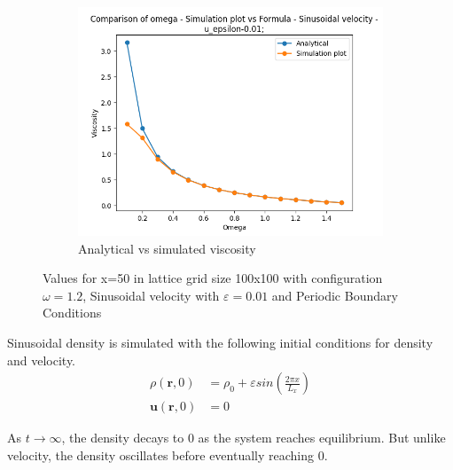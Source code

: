 \documentclass[a4paper,11pt]{report}
\begin{document}
\begin{figure}[h!]
    \begin{subfigure}{0.3\textwidth}
        \includegraphics[width=\linewidth]{HPC_report/images/shear_wave_decay/Omega_comparison_Sinusoidal velocity_0.1_1.5_15.png}
        \captionsetup{font=small}
        \caption{Analytical vs simulated viscosity}
        \label{fig:v_ac}
    \end{subfigure}
    \caption{Values for x=50 in lattice grid size 100x100 with configuration $\omega = 1.2$, Sinusoidal velocity with $\varepsilon = 0.01$ and Periodic Boundary Conditions}
\end{figure} 

Sinusoidal density is simulated with the following initial conditions for density and velocity.
\begin{equation}
    \begin{aligned}
        \rho \left( \mathbf{r}, 0 \right) &= \rho_0 + \varepsilon sin\left( \frac{2 \pi x} {L_x}\right) \\
        \mathbf{u} \left( \mathbf{r}, 0 \right) &= 0
    \end{aligned}
\end{equation}

As $t \rightarrow  \infty $, the density decays to 0 as the system reaches equilibrium. But unlike velocity, the density oscillates before eventually reaching 0.
\end{document}

